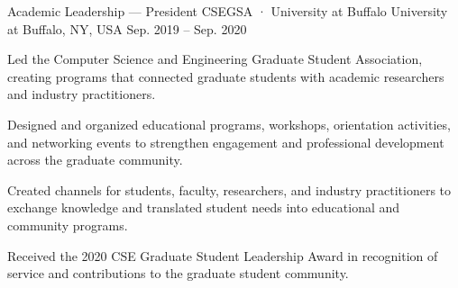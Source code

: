 
\begin{cventries}

\cventry
{Academic Leadership — President}
{CSEGSA · University at Buffalo}
{University at Buffalo, NY, USA}
{Sep. 2019 – Sep. 2020}
{
\begin{cvitems}
\item{Led the Computer Science and Engineering Graduate Student Association, creating programs that connected graduate students with academic researchers and industry practitioners.}
\item{Designed and organized educational programs, workshops, orientation activities, and networking events to strengthen engagement and professional development across the graduate community.}
\item{Created channels for students, faculty, researchers, and industry practitioners to exchange knowledge and translated student needs into educational and community programs.}
\item{Received the 2020 CSE Graduate Student Leadership Award in recognition of service and contributions to the graduate student community.}
\end{cvitems}
}

\end{cventries}